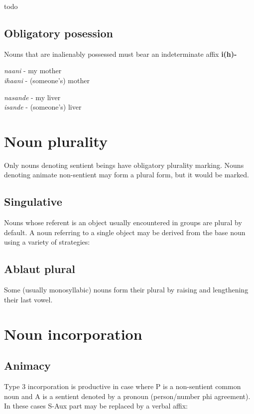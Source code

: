 \documentclass[8pt]{book}
\begin{document}
todo

\subsection{Obligatory posession}

Nouns that are inalienably possessed must bear an indeterminate affix \textbf{i(h)-}

\begin{exe}
\ex \textit{naani} - my mother \\
 \textit{ihaani} - (someone's) mother

\ex \textit{nasande} - my liver \\
 \textit{isande} - (someone's) liver

\end{exe}


\section{Noun plurality}
Only nouns denoting sentient beings have obligatory plurality marking. Nouns denoting animate non-sentient may form a plural form, but it would be marked. 



\subsection{Singulative}
Nouns whose referent is an object usually encountered in groups are plural by default. A noun referring to a single object may be derived from the base noun using a variety of strategies:


\subsection{Ablaut plural}
Some (usually monosyllabic) nouns form their plural by raising and lengthening their last vowel.



\section{Noun incorporation}

\subsection{Animacy}
Type 3 incorporation is productive in case where P is a non-sentient common noun and A is a sentient denoted by a pronoun (person/number phi agreement). In these cases S-Aux part may be replaced by a verbal affix:
\end{document}
